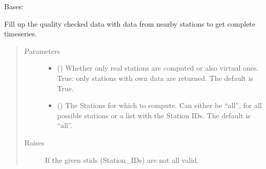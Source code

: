 \documentclass[letterpaper,10pt,english]{sphinxmanual}
\begin{document}

\begin{fulllineitems}
\label{\detokenize{weatherDB:weatherDB.stations.StationsTETBase}}
\sphinxAtStartPar
Bases: {\hyperref[\detokenize{weatherDB:weatherDB.stations.StationsBase}]{}}

\begin{fulllineitems}
\label{\detokenize{weatherDB:weatherDB.stations.StationsTETBase.fillup}}
\sphinxAtStartPar
Fill up the quality checked data with data from nearby stations to get complete timeseries.
\begin{quote}\begin{description}
\item[{Parameters}] \leavevmode\begin{itemize}
\item {} 
\sphinxAtStartPar
{} (\sphinxstyleliteralemphasis{\sphinxupquote{, }}) \textendash{} Whether only real stations are computed or also virtual ones.
True: only stations with own data are returned.
The default is True.

\item {} 
\sphinxAtStartPar
{} (\sphinxstyleliteralemphasis{\sphinxupquote{, }}) \textendash{} The Stations for which to compute.
Can either be “all”, for all possible stations
or a list with the Station IDs.
The default is “all”.

\end{itemize}

\item[{Raises}] \leavevmode
\sphinxAtStartPar
{} \textendash{} If the given stids (Station\_IDs) are not all valid.

\end{description}\end{quote}

\end{fulllineitems}


\end{fulllineitems}
\end{document}
